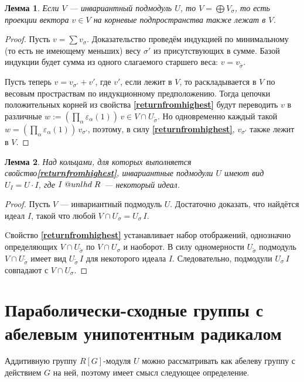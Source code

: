 \documentclass[12pt]{matmex-diploma}
\makeatletter
\newcommand{\slunlhd}{%
  \mathrel{\mathpalette\sl@unlhd\relax}%
}
\newcommand{\sl@unlhd}[2]{%
  \sbox\z@{$#1\lhd$}%
  \sbox\tw@{$#1\leqslant$}%
  \dimen@=\ht\tw@
  \advance\dimen@-\ht\z@
  \ifx#1\displaystyle
    \advance\dimen@ .2pt
  \else
    \ifx#1\textstyle
      \advance\dimen@ .2pt
    \fi
  \fi
  \ooalign{\raisebox{\dimen@}{$\m@th#1\lhd$}\cr$\m@th#1\leqslant$\cr}%
}
\theoremstyle{mystyleni}
\theoremstyle{mystyle}
\newtheorem{lm}{Лемма}
\newcommand\refb[1]{\textbf{\ref{#1}}}
\renewcommand{\trianglelefteq}{\slunlhd}
\makeatother
\begin{document}
\begin{lm}\label{weightprojections}
Если $V$ --- инвариантный подмодуль $U$, то $V = \bigoplus V_\sigma$, то есть проекции вектора $v \in V$ на корневые подпространства также лежат в $V$.
\end{lm}
\begin{proof}
Пусть $v = \sum v_\sigma$. Доказательство проведём индукцией по минимальному (то есть не имеющему меньших) весу $\sigma'$ из присутствующих в сумме. Базой индукции будет сумма из одного слагаемого старшего веса: $v = v_{\widetilde\sigma}$.

Пусть теперь $v = v_{\sigma'} + v'$, где $v'$, если лежит в $V$, то раскладывается в $V$ по весовым простраствам по индукционному предположению. Тогда цепочки положительных корней из свойства \refb{returnfromhighest} будут переводить $v$ в различные $w := \left(\prod_{\alpha}\varepsilon_\alpha(1)\right) \, v \in V \cap U_{\widetilde\sigma}$. Но одновременно каждый такой $w = \left(\prod_{\alpha}\varepsilon_\alpha(1)\right) \, v_{\sigma'}$, поэтому, в силу \refb{returnfromhighest}, $v_{\sigma'}$ также лежит в $V$.
\end{proof}

\begin{lm}\label{unipotentsubgroups}
Над кольцами, для которых выполняется свойство\refb{returnfromhighest}, инвариантные подмодули $U$ имеют вид $U_I = U \cdot I$, где $I \trianglelefteq R$ --- некоторый идеал.
\end{lm}
\begin{proof}
Пусть $V$ --- инвариантный подмодуль $U$. Достаточно доказать, что найдётся идеал $I$, такой что любой $V \cap U_\sigma = U_\sigma \, I$.

Cвойство \refb{returnfromhighest} устанавливает набор отображений, однозначно определяющих $V \cap U_{\widetilde\sigma}$ по $V \cap U_\sigma$ и наоборот. В силу одномерности $U_{\widetilde\sigma}$ подмодуль $V \cap U_{\widetilde\sigma}$ имеет вид $U_{\widetilde\sigma} \, I$ для некоторого идеала $I$. Следовательно, подмодули $U_{\sigma} \, I$ совпадают с $V \cap U_\sigma$.
\end{proof}

\pagebreak
\section{Параболически-сходные группы с абелевым унипотентным радикалом}

Аддитивную группу $R[G]$-модуля $U$ можно рассматривать как абелеву группу с действием $G$ на ней, поэтому
имеет смысл следующее определение.
\end{document}
